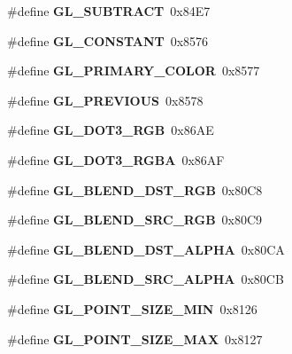 \begin{DoxyCompactItemize}
\item 
\#define {\bfseries G\+L\+\_\+\+S\+U\+B\+T\+R\+A\+C\+T}~0x84\+E7\label{_s_d_l__opengl_8h_a181172fc9fc3ac2d3189ff966484ac09}

\item 
\#define {\bfseries G\+L\+\_\+\+C\+O\+N\+S\+T\+A\+N\+T}~0x8576\label{_s_d_l__opengl_8h_a85a64b02e8734c9e6e0b12d9a9578d5e}

\item 
\#define {\bfseries G\+L\+\_\+\+P\+R\+I\+M\+A\+R\+Y\+\_\+\+C\+O\+L\+O\+R}~0x8577\label{_s_d_l__opengl_8h_aa038438b64c1ddcc4f6a55a3212fc472}

\item 
\#define {\bfseries G\+L\+\_\+\+P\+R\+E\+V\+I\+O\+U\+S}~0x8578\label{_s_d_l__opengl_8h_ac36f5aadd8726da49cbaf146a56a544d}

\item 
\#define {\bfseries G\+L\+\_\+\+D\+O\+T3\+\_\+\+R\+G\+B}~0x86\+A\+E\label{_s_d_l__opengl_8h_ab1a90a0b6d5bde2a751b881202a53831}

\item 
\#define {\bfseries G\+L\+\_\+\+D\+O\+T3\+\_\+\+R\+G\+B\+A}~0x86\+A\+F\label{_s_d_l__opengl_8h_aa052e4a5d3f11f1cc0f058b05356a67f}

\item 
\#define {\bfseries G\+L\+\_\+\+B\+L\+E\+N\+D\+\_\+\+D\+S\+T\+\_\+\+R\+G\+B}~0x80\+C8\label{_s_d_l__opengl_8h_ac3979a3a4c982af6bc325e14ab943cd1}

\item 
\#define {\bfseries G\+L\+\_\+\+B\+L\+E\+N\+D\+\_\+\+S\+R\+C\+\_\+\+R\+G\+B}~0x80\+C9\label{_s_d_l__opengl_8h_aeb51171f8c89cddec550fba045e62651}

\item 
\#define {\bfseries G\+L\+\_\+\+B\+L\+E\+N\+D\+\_\+\+D\+S\+T\+\_\+\+A\+L\+P\+H\+A}~0x80\+C\+A\label{_s_d_l__opengl_8h_a1e8f20eb4f51cb2254e13789a19f48cd}

\item 
\#define {\bfseries G\+L\+\_\+\+B\+L\+E\+N\+D\+\_\+\+S\+R\+C\+\_\+\+A\+L\+P\+H\+A}~0x80\+C\+B\label{_s_d_l__opengl_8h_af2983dce40f413d43ca839abdeafd3ff}

\item 
\#define {\bfseries G\+L\+\_\+\+P\+O\+I\+N\+T\+\_\+\+S\+I\+Z\+E\+\_\+\+M\+I\+N}~0x8126\label{_s_d_l__opengl_8h_a1b40949a3039e44a2fb5e7a9a6ff6ded}

\item 
\#define {\bfseries G\+L\+\_\+\+P\+O\+I\+N\+T\+\_\+\+S\+I\+Z\+E\+\_\+\+M\+A\+X}~0x8127\label{_s_d_l__opengl_8h_a171aeb07c5b056c848d518caaec78bb6}


\end{DoxyCompactItemize}
